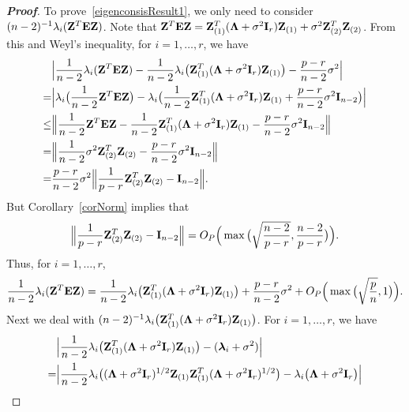 \documentclass[3p]{elsarticle}
\newcommand{\bZ}{\mathbf{Z}}
\newcommand{\bfsym}[1]{\ensuremath{\boldsymbol{#1}}}
\def\blambda {\bfsym {\lambda}}        \def\bLambda {\bfsym {\Lambda}}
\theoremstyle{plain}
\theoremstyle{definition}
\theoremstyle{remark}
\begin{document}
\begin{appendices}
\begin{proof}[\textbf{Proof}]
    To prove~\eqref{eigenconsisResult1}, we only need to consider $(n-2)^{-1}\lambda_i(\bZ^T \BE \bZ)$.
Note that
$
    \bZ^T \BE \bZ= \bZ_{(1)}^T (\bLambda +\sigma^2 \BI_r) \bZ_{(1)}+
\sigma^2 \bZ_{(2)}^T  \bZ_{(2)}
$.
From this and Weyl's inequality, 
for $i=1,\ldots, r$, we have 
$$
    \begin{aligned}
        &\Big|\frac{1}{n-2}\lambda_i(\BZ^T \BE \BZ)
    -\frac{1}{n-2}\lambda_i\big(\BZ_{(1)}^T (\bLambda+\sigma^2 \BI_r)\BZ_{(1)}\big)
    -\frac{p-r}{n-2}\sigma^2
    \Big|
        \\
        =&\Big|\lambda_i\big(\frac{1}{n-2}\BZ^T \BE \BZ\big)
        -\lambda_i\big(\frac{1}{n-2}\BZ_{(1)}^T (\bLambda+\sigma^2 \BI_r)\BZ_{(1)}+\frac{p-r}{n-2}\sigma^2 \BI_{n-2}\big)
    \Big|
        \\
        \leq &
        \Big\|\frac{1}{n-2}\BZ^T \BE \BZ
    -\frac{1}{n-2}\BZ_{(1)}^T (\bLambda+\sigma^2 \BI_r)\BZ_{(1)}
        -\frac{p-r}{n-2}\sigma^2\BI_{n-2}
        \Big\|
        \\
        = &
        \Big\|
        \frac{1}{n-2}\sigma^2 \bZ_{(2)}^T  \bZ_{(2)}
        -\frac{p-r}{n-2}\sigma^2\BI_{n-2}
        \Big\|
        \\
        = &
        \frac{p-r}{n-2}
\sigma^2
        \Big\|
        \frac{1}{p-r}
         \bZ_{(2)}^T  \bZ_{(2)}
        -\BI_{n-2}
        \Big\|.
    \end{aligned}
$$
    But Corollary~\ref{corNorm} implies that
    $$
        \Big\|
        \frac{1}{p-r}
         \bZ_{(2)}^T  \bZ_{(2)}
        -\BI_{n-2}
        \Big\|=O_P\Big(\max\big(\sqrt{\frac{n-2}{p-r}},\frac{n-2}{p-r}\big)\Big).
    $$
    Thus, for $i=1,\ldots,r$,
\begin{equation}\label{toutengjiayou1}
\frac{1}{n-2}\lambda_i(\BZ^T \BE \BZ)
=\frac{1}{n-2}\lambda_i\big(\BZ_{(1)}^T (\bLambda+\sigma^2 \BI_r)\BZ_{(1)}\big)
+\frac{p-r}{n-2}\sigma^2
+
O_P\Big(\max\big(\sqrt{\frac{p}{n}},1\big)\Big).
\end{equation}
    Next we deal with $(n-2)^{-1}\lambda_i\big(\BZ_{(1)}^T (\bLambda+\sigma^2 \BI_r)\BZ_{(1)}\big)$.
    For $i=1,\ldots, r$, we have
$$
    \begin{aligned}
        &\Big|\frac{1}{n-2}\lambda_i \big(\bZ_{(1)}^T(\bLambda+\sigma^2 \BI_r)\bZ_{(1)}\big)-(\blambda_i +\sigma^2)\Big|\\
        =&
        \Big|\frac{1}{n-2}\lambda_i \big((\bLambda+\sigma^2 \BI_r)^{1/2}\bZ_{(1)}\bZ_{(1)}^T(\bLambda+\sigma^2 \BI_r)^{1/2}\big)
        -\lambda_i\big(\bLambda+\sigma^2 \BI_r\big)\Big|\\

\end{aligned}$$
\end{proof}
\end{appendices}
\end{document}
